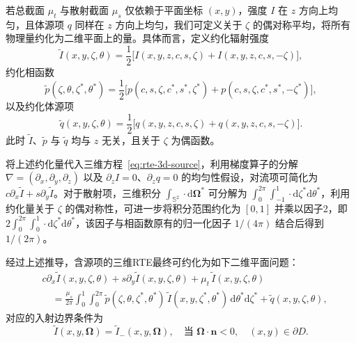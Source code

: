 若总截面 $\mu_t$ 与散射截面 $\mu_s$ 仅依赖于平面坐标 $(x,y)$，强度 $I$ 在 $z$ 方向上均匀，且体源项 $q$ 同样在 $z$ 方向上均匀，我们可定义关于 $\zeta$ 的偶对称平均，将所有物理量约化为二维平面上的量。具体而言，定义约化辐射强度
\begin{equation}
    \tilde{I}(x, y,\zeta,\theta) = \frac{1}{2}\bigl[I(x,y,z,c,s,\zeta) + I(x,y,z,c,s,-\zeta)\bigr],
\end{equation}
约化相函数
\begin{equation}
    \tilde{p}(\zeta,\theta,\zeta^*, \theta^*) = \frac{1}{2}\bigl[p(c,s,\zeta, c^*,s^*,\zeta^*) + p(c,s,\zeta, c^*,s^*,-\zeta^*)\bigr],
\end{equation}
以及约化体源项
\begin{equation}
    \tilde{q}(x, y,\zeta,\theta) = \frac{1}{2}\bigl[q(x,y,z,c,s,\zeta) + q(x,y,z,c,s,-\zeta)\bigr].
\end{equation}
此时 $\tilde{I}$、$\tilde{p}$ 与 $\tilde{q}$ 均与 $z$ 无关，且关于 $\zeta$ 为偶函数。

将上述约化量代入三维方程~\eqref{eq:rte-3d-source}，利用梯度算子的分解 $\nabla = (\partial_x, \partial_y, \partial_z)$ 以及 $\partial_z I = 0$、$\partial_z q = 0$ 的均匀性假设，对流项可简化为 $c\partial_x \tilde{I} + s\partial_y \tilde{I}$。对于散射项，三维积分 $\int_{\mathbb{S}^2} \cdot \mathrm{d}\boldsymbol{\Omega}^*$ 可分解为 $\int_0^{2\pi} \int_{-1}^1 \cdot \mathrm{d}\zeta^* \mathrm{d}\theta^*$，利用约化量关于 $\zeta$ 的偶对称性，可进一步将积分范围约化为 $[0,1]$ 并乘以因子2，即 $2\int_0^{2\pi} \int_0^1 \cdot \mathrm{d}\zeta^* \mathrm{d}\theta^*$，该因子与相函数原有的归一化因子 $1/(4\pi)$ 结合后得到 $1/(2\pi)$。

经过上述推导，含源项的三维RTE最终可约化为如下二维平面问题：
\begin{equation}\label{eq:rte-2d-reduced-source}
    \begin{aligned}
         & c\partial_x \tilde{I}(x,y,\zeta,\theta)+s\partial_y \tilde{I}(x,y,\zeta,\theta)+\mu_t \,\tilde{I}(x,y,\zeta,\theta)                                                       \\
         & \quad= \frac{\mu_s}{2\pi}\int_{0}^{1}\int_0^{2\pi} \tilde{p}(\zeta, \theta, \zeta^*,\theta^*) \,\tilde{I}(x,y,\zeta^*,\theta^*) \,\mathrm{d}{\theta^*}\mathrm{d}{\zeta^*}
        + \tilde{q}(x,y,\zeta,\theta),
    \end{aligned}
\end{equation}
对应的入射边界条件为
\begin{equation}
    \tilde{I}(x,y,\boldsymbol{\Omega})=\tilde{I}_{-}(x,y,\boldsymbol{\Omega}), \quad \text{当 }
    \boldsymbol{\Omega}\cdot\bm{n}<0,\quad (x, y)\in\partial D.
\end{equation}

